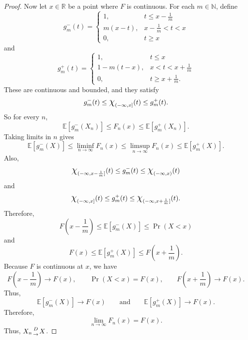 \documentclass{article}
\theoremstyle{definition}\newtheorem{definition}{DEF}
\theoremstyle{definition}\newtheorem{example}{Ex}
\theoremstyle{lemma}\newtheorem{lemma}{Lemma}
\theoremstyle{corrolary}\newtheorem{corrolary}{Cor}
\begin{document}
\begin{proof}
Now let $x\in \mathbb{R}$ be a point where $F$ is continuous.
For each $m\in \mathbb{N}$, define
\begin{equation*}
g_m^-(t)=
\begin{cases}
1, & t\leq x-\frac{1}{m}\\
m(x-t), & x-\frac{1}{m}<t<x\\
0, & t\geq x
\end{cases}
\end{equation*}
and
\begin{equation*}
g_m^+(t)=
\begin{cases}
1, & t\leq x\\
1-m(t-x), & x<t<x+\frac{1}{m}\\
0, & t\geq x+\frac{1}{m}.
\end{cases}
\end{equation*}
These are continuous and bounded, and they satisfy
\begin{equation*}
g_m^-(t)\leq \mbox{\Large$\chi$}_{(-\infty, x]}(t)\leq g_m^+(t).
\end{equation*}
So for every $n$,
\begin{equation*}
\mathbb{E}[g_m^-(X_n)]\leq F_n(x)\leq \mathbb{E}[g_m^+(X_n)].
\end{equation*}
Taking limits in $n$ gives
\begin{equation*}
\mathbb{E}[g_m^-(X)]\leq \liminf_{n\rightarrow \infty} F_n(x)\leq \limsup_{n\rightarrow \infty} F_n(x)\leq \mathbb{E}[g_m^+(X)].
\end{equation*}
Also,
\begin{equation*}
\mbox{\Large$\chi$}_{(-\infty, x-\frac{1}{m}]}(t)\leq g_m^-(t)\leq \mbox{\Large$\chi$}_{(-\infty, x)}(t)
\end{equation*}
and
\begin{equation*}
\mbox{\Large$\chi$}_{(-\infty, x]}(t)\leq g_m^+(t)\leq \mbox{\Large$\chi$}_{(-\infty, x+\frac{1}{m}]}(t).
\end{equation*}
Therefore,
\begin{equation*}
F\left(x-\frac{1}{m}\right)\leq \mathbb{E}[g_m^-(X)]\leq \Pr(X<x)
\end{equation*}
and
\begin{equation*}
F(x)\leq \mathbb{E}[g_m^+(X)]\leq F\left(x+\frac{1}{m}\right).
\end{equation*}
Because $F$ is continuous at $x$, we have
\begin{equation*}
F\left(x-\frac{1}{m}\right)\rightarrow F(x),
\qquad
\Pr(X<x)=F(x),
\qquad
F\left(x+\frac{1}{m}\right)\rightarrow F(x).
\end{equation*}
Thus,
\begin{equation*}
\mathbb{E}[g_m^-(X)]\rightarrow F(x)
\qquad \text{and} \qquad
\mathbb{E}[g_m^+(X)]\rightarrow F(x).
\end{equation*}
Therefore,
\begin{equation*}
\lim_{n\rightarrow \infty} F_n(x)=F(x).
\end{equation*}
Thus, $X_n {D \atop \rightarrow} X$.
\end{proof}
\end{document}
